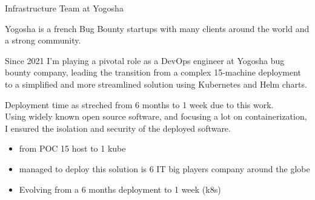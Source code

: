 \documentclass[10pt,a4paper,ragged2e,withhyper]{altacv}
\begin{document}
\begin{paracol}{2}



\parskip=12pt %

Infrastructure Team at Yogosha

Yogosha is a french Bug Bounty startups with many clients around the world and a strong community.

Since 2021 I'm playing a pivotal role as a DevOps engineer at  Yogosha bug bounty company, leading the transition from a complex 15-machine deployment to a simplified and more streamlined solution using Kubernetes and Helm charts. 

Deployment time as streched from 6 months to 1 week due to this work.\\

Using widely known open source software, and focusing a lot on containerization, I ensured the isolation and security of the deployed software.\\
\begin{itemize}
\item from POC 15 host to 1 kube
\item managed to deploy this solution is 6 IT big players company around the globe
\item Evolving from a 6 months deployment to 1 week (k8s)
\end{itemize}

\parskip=0pt %


\hspace*{-2.5em}  %




\end{paracol}
\end{document}
